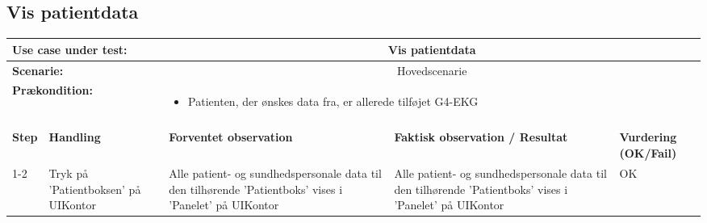 \subsection{Vis patientdata}
\begin{tabular}{|p{1cm}|p{3cm}|p{4cm}|p{4cm}|p{2cm}|}
\hline
\multicolumn{2}{|p{4cm}|}{\textbf{Use case under test:}} & \multicolumn{3}{c|}{Vis patientdata} \\\hline

\multicolumn{2}{|p{3cm}|}{\textbf{Scenarie:}} & \multicolumn{3}{c|}{Hovedscenarie} \\\hline

\multicolumn{2}{|p{3cm}|}{\textbf{Prækondition:}}  & \multicolumn{3}{l|}{\parbox{0.6\textwidth}{
\begin{itemize}[label=$\circ$]
\item Patienten, der ønskes data fra, er allerede tilføjet G4-EKG 
\end{itemize} }}\\\hline

\multicolumn{5}{|c|}{} \\\hline

\textbf{Step} & \textbf{Handling} & \textbf{Forventet observation} & \textbf{Faktisk observation / Resultat} & \textbf{Vurdering (OK/Fail)}\\\hline

1-2 & Tryk på 'Patientboksen' på UIKontor & Alle patient- og sundhedspersonale data til den tilhørende 'Patientboks' vises i 'Panelet' på UIKontor & Alle patient- og sundhedspersonale data til den tilhørende 'Patientboks' vises i 'Panelet' på UIKontor & OK \\\hline

\end{tabular}
\\

